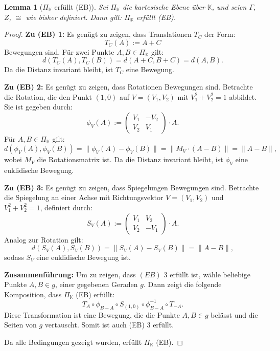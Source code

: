 \documentclass[a4paper,12pt]{article}
\theoremstyle{break}
\newtheorem{lemma}[definition]{Lemma}
\begin{document}
\begin{lemma}[\(\Pi_\mathbb{K}\) erfüllt (EB)]\label{lemma:pi_eb}
Sei \(\Pi_\mathbb{K}\) die kartesische Ebene über \(\mathbb{K}\), und seien \(\Gamma\), \(Z\), \(\cong\) wie bisher definiert. Dann gilt:  
\(\Pi_\mathbb{K}\) erfüllt (EB).
\end{lemma}

\begin{proof}
\textbf{Zu (EB) 1:}  
Es genügt zu zeigen, dass Translationen \(T_C\) der Form:
\[
T_C(A) := A + C
\]
Bewegungen sind. Für zwei Punkte \(A, B \in \Pi_\mathbb{K}\) gilt:
\[
d(T_C(A), T_C(B)) = d(A + C, B + C) = d(A, B).
\]
Da die Distanz invariant bleibt, ist \(T_C\) eine Bewegung.

\textbf{Zu (EB) 2:}  
Es genügt zu zeigen, dass Rotationen Bewegungen sind. Betrachte die Rotation, die den Punkt \((1,0)\) auf \(V = (V_1, V_2)\) mit \(V_1^2 + V_2^2 = 1\) abbildet. Sie ist gegeben durch:
\[
\phi_V(A) := \begin{pmatrix}
V_1 & -V_2 \\
V_2 & V_1
\end{pmatrix} \cdot A.
\]
Für \(A, B \in \Pi_\mathbb{K}\) gilt:
\[
d(\phi_V(A), \phi_V(B)) = \| \phi_V(A) - \phi_V(B) \| = \| M_V \cdot (A - B) \| = \| A - B \|,
\]
wobei \(M_V\) die Rotationsmatrix ist. Da die Distanz invariant bleibt, ist \(\phi_V\) eine euklidische Bewegung.

\textbf{Zu (EB) 3:}  
Es genügt zu zeigen, dass Spiegelungen Bewegungen sind. Betrachte die Spiegelung an einer Achse mit Richtungsvektor \(V = (V_1, V_2)\) und \(V_1^2 + V_2^2 = 1\), definiert durch:
\[
S_V(A) := \begin{pmatrix}
V_1 & V_2 \\
V_2 & -V_1
\end{pmatrix} \cdot A.
\]
Analog zur Rotation gilt:
\[
d(S_V(A), S_V(B)) = \| S_V(A) - S_V(B) \| = \| A - B \|,
\]
sodass \(S_V\) eine euklidische Bewegung ist.

\textbf{Zusammenführung:}  
Um zu zeigen, dass \((EB)\) 3 erfüllt ist, wähle beliebige Punkte \(A, B \in g\), einer gegebenen Geraden \(g\). Dann zeigt die folgende Komposition, dass \(\Pi_\mathbb{K}\) (EB) erfüllt:
\[
T_A \circ \phi_{B - A} \circ S_{(1,0)} \circ \phi_{B - A}^{-1} \circ T_{-A}.
\]
Diese Transformation ist eine Bewegung, die die Punkte \(A, B \in g\) belässt und die Seiten von \(g\) vertauscht. Somit ist auch (EB) 3 erfüllt.

Da alle Bedingungen gezeigt wurden, erfüllt \(\Pi_\mathbb{K}\) (EB).
\end{proof}
\end{document}
